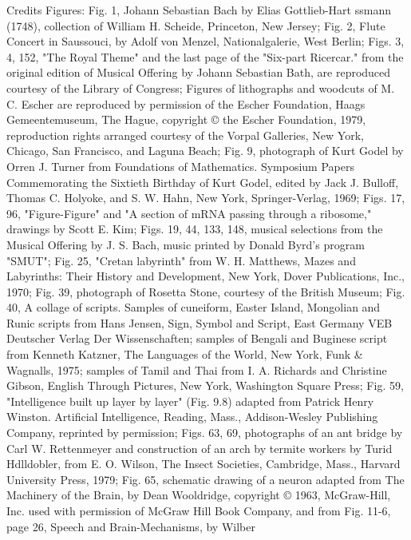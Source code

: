 
                                       Credits
Figures: Fig. 1, Johann Sebastian Bach by Elias Gottlieb-Hart ssmann (1748), collection
of William H. Scheide, Princeton, New Jersey; Fig. 2, Flute Concert in Saussouci, by
Adolf von Menzel, Nationalgalerie, West Berlin; Figs. 3, 4, 152, "The Royal Theme" and
the last page of the "Six-part Ricercar." from the original edition of Musical Offering by
Johann Sebastian Bath, are reproduced courtesy of the Library of Congress; Figures of
lithographs and woodcuts of M. C. Escher are reproduced by permission of the Escher
Foundation, Haags Gemeentemuseum, The Hague, copyright © the Escher Foundation,
1979, reproduction rights arranged courtesy of the Vorpal Galleries, New York, Chicago,
San Francisco, and Laguna Beach; Fig. 9, photograph of Kurt Godel by Orren J. Turner
from Foundations of
Mathematics. Symposium Papers Commemorating the Sixtieth Birthday of Kurt Godel,
edited by
Jack J. Bulloff, Thomas C. Holyoke, and S. W. Hahn, New York, Springer-Verlag, 1969;
Figs. 17, 96, "Figure-Figure" and "A section of mRNA passing through a ribosome,"
drawings by Scott E. Kim; Figs. 19, 44, 133, 148, musical selections from the Musical
Offering by J. S. Bach, music printed by Donald Byrd's program "SMUT"; Fig. 25,
"Cretan labyrinth" from W. H. Matthews, Mazes and Labyrinths: Their History and
Development, New York, Dover Publications, Inc., 1970; Fig. 39, photograph of Rosetta
Stone, courtesy of the British Museum; Fig. 40, A collage of scripts. Samples of
cuneiform, Easter Island, Mongolian and Runic scripts from Hans Jensen, Sign, Symbol
and Script, East Germany VEB Deutscher Verlag Der Wissenschaften; samples of
Bengali and Buginese script from Kenneth Katzner, The Languages of the World, New
York, Funk \& Wagnalls, 1975; samples of Tamil and Thai from I. A. Richards and
Christine Gibson, English Through Pictures, New York, Washington Square Press; Fig.
59, "Intelligence built up layer by layer" (Fig. 9.8) adapted from Patrick Henry Winston.
Artificial Intelligence, Reading, Mass., Addison-Wesley Publishing Company, reprinted
by permission; Figs. 63, 69, photographs of an ant bridge by Carl W. Rettenmeyer and
construction of an arch by termite workers by Turid Hdlldobler, from E. O. Wilson, The
Insect Societies, Cambridge, Mass., Harvard University Press, 1979; Fig. 65, schematic
drawing of a neuron adapted from The Machinery of the Brain, by Dean Wooldridge,
copyright © 1963, McGraw-Hill, Inc. used with permission of McGraw Hill Book
Company, and from Fig. 11-6, page 26, Speech and Brain-Mechanisms, by Wilber
